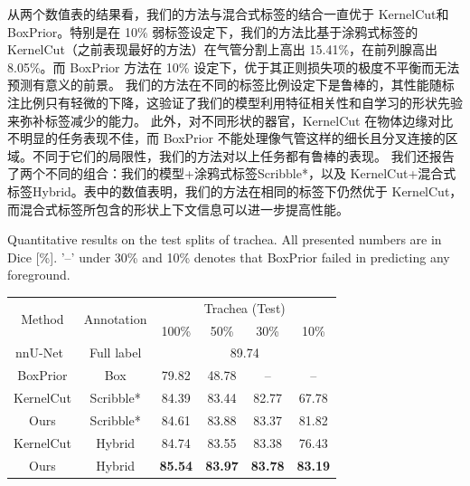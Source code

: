 从两个数值表的结果看，我们的方法与混合式标签的结合一直优于 KernelCut\citep{tang2018regularized}和 BoxPrior\citep{kervadec2020bounding}。特别是在 10\% 弱标签设定下，我们的方法比基于涂鸦式标签的 KernelCut（之前表现最好的方法）在气管分割上高出 15.41\%，在前列腺高出 8.05\%。而 BoxPrior 方法在 10\% 设定下，优于其正则损失项的极度不平衡而无法预测有意义的前景。%
我们的方法在不同的标签比例设定下是鲁棒的，其性能随标注比例只有轻微的下降，这验证了我们的模型利用特征相关性和自学习的形状先验来弥补标签减少的能力。
此外，对不同形状的器官，KernelCut 在物体边缘对比不明显的任务表现不佳，而 BoxPrior 不能处理像气管这样的细长且分叉连接的区域。不同于它们的局限性，我们的方法对以上任务都有鲁棒的表现。    %
我们还报告了两个不同的组合：我们的模型+涂鸦式标签Scribble*，以及 KernelCut+混合式标签Hybrid。表中的数值表明，我们的方法在相同的标签下仍然优于 KernelCut，而混合式标签所包含的形状上下文信息可以进一步提高性能。


    \begin{table}[t!]
        {Quantitative results on the test splits of trachea. All presented numbers are in Dice [\%]. '--' under 30\% and 10\% denotes that BoxPrior failed in predicting any foreground.}
        \centering    
            \begin{tabular}{c|c|c c c c }
                \toprule
                \multirow{2}{*}{Method} & \multirow{2}{*}{Annotation} & \multicolumn{4}{c}{Trachea (Test)}  \\ 
                &                        & 100\% & 50\% & 30\% & 10\%                             \\ \midrule
                nnU-Net~\cite{isensee2019automated}     & Full label        & \multicolumn{4}{c}{89.74}          \\ \cmidrule{1-6}
                BoxPrior\cite{kervadec2020bounding}    & Box  & 79.82  & 48.78  & -- & --  \\
                KernelCut\cite{tang2018regularized}   & Scribble* & 84.39  & 83.44  & 82.77  & 67.78  \\
                Ours & Scribble* & 84.61 & 83.88 & 83.37 & 81.82  \\
                KernelCut\cite{tang2018regularized}   & Hybrid & 84.74 & 83.55	& 83.38	& 76.43             \\
                Ours        & Hybrid    & \textbf{85.54} & \textbf{83.97} & \textbf{83.78} & \textbf{83.19}                           \\
                \bottomrule
            \end{tabular}
        
        \label{tab:test_res1}
    \end{table}


